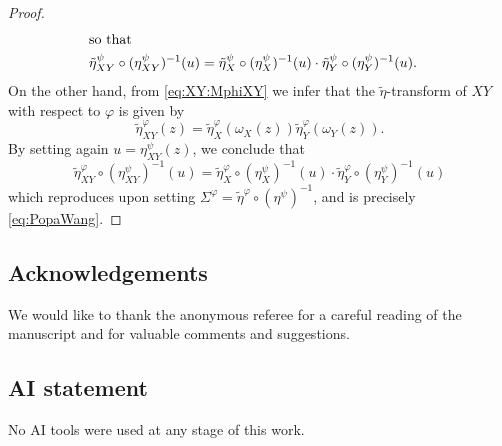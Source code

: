\documentclass[12pt]{amsart}
\theoremstyle{definition}
\numberwithin{equation}{section}
\begin{document}
\begin{proof}
\begin{align*}
      \intertext{so that}
      \tilde{\eta}^\psi_{XY}\circ(\eta^\psi_{XY})^{-1}(u)
    &= \tilde{\eta}^\psi_X\circ(\eta^\psi_{X})^{-1}(u)
      \cdot
      \tilde{\eta}^\psi_Y\circ(\eta^\psi_{Y})^{-1}(u).
  \end{align*}
  On the other hand, from \eqref{eq:XY:MphiXY} we infer that the $\tilde\eta$-transform of $XY$ with respect to $\varphi$ is given by
  \[
    \tilde{\eta}^\varphi_{XY}(z)
    = \tilde{\eta}^\varphi_X(\omega_X(z))\tilde{\eta}^\varphi_Y(\omega_Y(z)).
  \]
  By setting again $u = \eta_{XY}^\psi(z)$, we conclude that
  \begin{equation*}
    \tilde{\eta}^\varphi_{XY}\circ(\eta^\psi_{XY})^{-1}(u)
    =
    \tilde{\eta}^\varphi_{X}\circ(\eta^\psi_{X})^{-1}(u)
    \cdot
    \tilde{\eta}^\varphi_{Y}\circ(\eta^\psi_{Y})^{-1}(u)    
  \end{equation*}
  which reproduces \cite[Lemma~2.1]{PopaWang:2011:multiplicative} upon setting $\Sigma^\varphi = \tilde{\eta}^\varphi \circ (\eta^\psi)^{-1}$, and is precisely \eqref{eq:PopaWang}.
\end{proof}


\noindent

\subsection*{Acknowledgements}
We would like to thank the anonymous referee for a careful reading of the manuscript and for valuable comments and suggestions.

\subsection*{AI statement}
No AI tools were used at any stage of this work.


%
%



\end{document}
